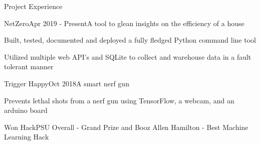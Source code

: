 \documentclass{resume} %
\begin{document}
\begin{rSection}{Project Experience}

\begin{rSubsection}{NetZero}{Apr 2019 - Present}{A tool to glean insights on the efficiency of a house}{}
\item Built, tested, documented and deployed a fully fledged Python command line tool
\item Utilized multiple web API's and SQLite to collect and warehouse data in a fault tolerant manner
\end{rSubsection}

\begin{rSubsection}{Trigger Happy}{Oct 2018}{A smart nerf gun}{}
\item Prevents lethal shots from a nerf gun using TensorFlow, a webcam, and an arduino board
\item Won HackPSU Overall - Grand Prize and Booz Allen Hamilton - Best Machine Learning Hack
\end{rSubsection}

\end{rSection}
\end{document}
